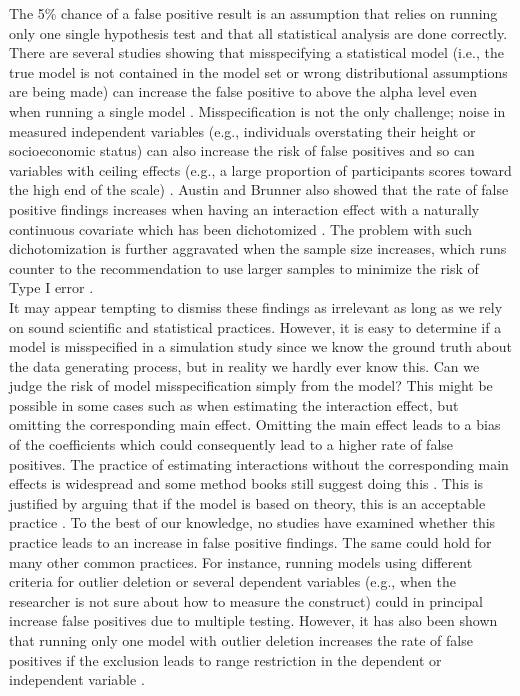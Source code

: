 The 5\% chance of a false positive result is an assumption that relies on running only one single hypothesis test and that all statistical analysis are done correctly. There are several studies showing that misspecifying a statistical model (i.e., the true model is not contained in the model set or wrong distributional assumptions are being made) can increase the false positive to above the alpha level even when running a single model \citep{Dennis2019,Litiere2007}. Misspecification is not the only challenge; noise in measured independent variables (e.g., individuals overstating their height or socioeconomic status) can also increase the risk of false positives \citep{Brunner2009} and so can variables with ceiling effects (e.g., a large proportion of participants scores toward the high end of the scale) \citep{Austin2003}. Austin and Brunner also showed that the rate of false positive findings increases when having an interaction effect with a naturally continuous covariate which has been dichotomized \citep{Austin2004}. The problem with such dichotomization is further aggravated when the sample size increases, which runs counter to the recommendation to use larger samples to minimize the risk of Type I error \citep{simmons2018}. 
\\
It may appear tempting to dismiss these findings as irrelevant as long as we rely on sound scientific and statistical practices. However, it is easy to determine if a model is misspecified in a simulation study since we know the ground truth about the data generating process, but in reality we hardly ever know this. Can we judge the risk of model misspecification simply from the model? This might be possible in some cases such as when estimating the interaction effect, but omitting the corresponding main effect. Omitting the main effect leads to a bias of the coefficients \citep{Branbor2006} which could consequently lead to a higher rate of false positives. The practice of estimating interactions without the corresponding main effects is widespread \citep{Branbor2006} and some method books still suggest doing this \citep{Cleves2008}. This is justified by arguing that if the model is based on theory, this is an acceptable practice \citep{aiken1991multiple}. To the best of our knowledge, no studies have examined whether this practice leads to an increase in false positive findings. The same could hold for many other common practices. For instance, running models using different criteria for outlier deletion or several dependent variables (e.g., when the researcher is not sure about how to measure the construct) could in principal increase false positives due to multiple testing. However, it has also been shown that running only one model with outlier deletion increases the rate of false positives if the exclusion leads to range restriction in the dependent or independent variable \citep{Raju2003}. \\        

